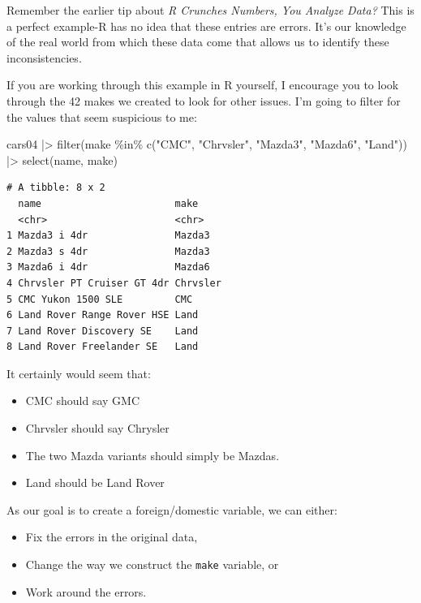 \documentclass[
  letterpaper,
]{book}
\newenvironment{Shaded}{\begin{snugshade}}{\end{snugshade}}
\newcommand{\FunctionTok}[1]{\textcolor[rgb]{0.28,0.35,0.67}{#1}}
\newcommand{\NormalTok}[1]{\textcolor[rgb]{0.00,0.23,0.31}{#1}}
\newcommand{\SpecialCharTok}[1]{\textcolor[rgb]{0.37,0.37,0.37}{#1}}
\newcommand{\StringTok}[1]{\textcolor[rgb]{0.13,0.47,0.30}{#1}}
\providecommand{\tightlist}{%
  \setlength{\itemsep}{0pt}\setlength{\parskip}{0pt}}\usepackage{longtable,booktabs,array}
\begin{document}
Remember the earlier tip about \emph{R Crunches Numbers, You Analyze
Data?} This is a perfect example-R has no idea that these entries are
errors. It's our knowledge of the real world from which these data come
that allows us to identify these inconsistencies.

If you are working through this example in R yourself, I encourage you
to look through the 42 makes we created to look for other issues. I'm
going to filter for the values that seem suspicious to me:

\begin{Shaded}
\begin{Highlighting}[]
\NormalTok{cars04 }\SpecialCharTok{|\textgreater{}} 
  \FunctionTok{filter}\NormalTok{(make }\SpecialCharTok{\%in\%} \FunctionTok{c}\NormalTok{(}\StringTok{"CMC"}\NormalTok{, }\StringTok{"Chrvsler"}\NormalTok{, }\StringTok{"Mazda3"}\NormalTok{, }\StringTok{"Mazda6"}\NormalTok{, }\StringTok{"Land"}\NormalTok{)) }\SpecialCharTok{|\textgreater{}} 
  \FunctionTok{select}\NormalTok{(name, make)}
\end{Highlighting}
\end{Shaded}

\begin{verbatim}
# A tibble: 8 x 2
  name                       make    
  <chr>                      <chr>   
1 Mazda3 i 4dr               Mazda3  
2 Mazda3 s 4dr               Mazda3  
3 Mazda6 i 4dr               Mazda6  
4 Chrvsler PT Cruiser GT 4dr Chrvsler
5 CMC Yukon 1500 SLE         CMC     
6 Land Rover Range Rover HSE Land    
7 Land Rover Discovery SE    Land    
8 Land Rover Freelander SE   Land    
\end{verbatim}

It certainly would seem that:

\begin{itemize}
\tightlist
\item
  CMC should say GMC
\item
  Chrvsler should say Chrysler
\item
  The two Mazda variants should simply be Mazdas.
\item
  Land should be Land Rover
\end{itemize}

As our goal is to create a foreign/domestic variable, we can either:

\begin{itemize}
\tightlist
\item
  Fix the errors in the original data,
\item
  Change the way we construct the \texttt{make} variable, or
\item
  Work around the errors.
\end{itemize}
\end{document}

